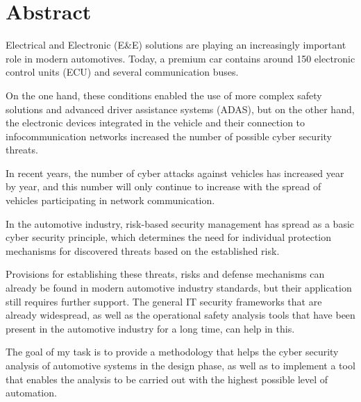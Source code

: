 \chapter*{Abstract}

Electrical and Electronic (E\&E) solutions are playing an increasingly important role in modern automotives. Today, a premium car contains around 150 electronic control units (ECU) and several communication buses.

On the one hand, these conditions enabled the use of more complex safety solutions and advanced driver assistance systems (ADAS), but on the other hand, the electronic devices integrated in the vehicle and their connection to infocommunication networks increased the number of possible cyber security threats.

In recent years, the number of cyber attacks against vehicles has increased year by year, and this number will only continue to increase with the spread of vehicles participating in network communication.

In the automotive industry, risk-based security management has spread as a basic cyber security principle, which determines the need for individual protection mechanisms for discovered threats based on the established risk.

Provisions for establishing these threats, risks and defense mechanisms can already be found in modern automotive industry standards, but their application still requires further support. The general IT security frameworks that are already widespread, as well as the operational safety analysis tools that have been present in the automotive industry for a long time, can help in this.

The goal of my task is to provide a methodology that helps the cyber security analysis of automotive systems in the design phase, as well as to implement a tool that enables the analysis to be carried out with the highest possible level of automation.

\vfill
\cleardoublepage

\selectthesislanguage

\setcounter{romanPage}{\value{page}}
